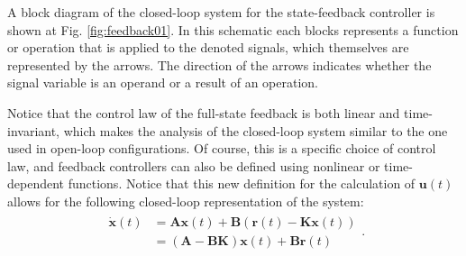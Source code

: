 \documentclass[a4paper,11pt]{book}
\numberwithin{figure}{chapter}
\numberwithin{equation}{chapter}
\numberwithin{table}{chapter}
\theoremstyle{definition}
\begin{document}
A block diagram of the closed-loop system for the state-feedback controller is shown at Fig. \ref{fig:feedback01}. In this schematic each blocks represents a function or operation that is applied to the denoted signals, which themselves are represented by the arrows. The direction of the arrows indicates whether the signal variable is an operand or a result of an operation. 

Notice that the control law of the full-state feedback is both linear and time-invariant, which makes the analysis of the closed-loop system similar to the one used in open-loop configurations.  Of course, this is a specific choice of control law, and feedback controllers can also be defined using nonlinear or time-dependent functions. Notice that this new definition for the calculation of $\bm{u}(t)$ allows for the following closed-loop representation of the system:
\begin{align}
\begin{split}
    \dot{\bm{x}}(t) &= \bm{A} \bm{x}(t) + \bm{B} \left( \bm{r}(t) - \bm{K} \bm{x}(t) \right) \\
    	 &= \left( \bm{A} - \bm{B} \bm{K} \right) \bm{x}(t) + \bm{B} \bm{r}(t)
\end{split}
.\end{align}
\end{document}
